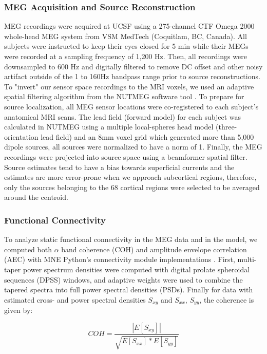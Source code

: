 \subsubsection{MEG Acquisition and Source Reconstruction}
MEG recordings were acquired at UCSF using a 275-channel CTF Omega 2000 whole-head MEG system from VSM MedTech (Coquitlam, BC, Canada). All subjects were instructed to keep their eyes closed for 5 min while their MEGs were recorded at a sampling frequency of 1,200 Hz. Then, all recordings were downsampled to 600 Hz and digitally filtered to remove DC offset and other noisy artifact outside of the 1 to 160Hz bandpass range prior to source reconstructions. To "invert" our sensor space recordings to the MRI voxels, we used an adaptive spatial filtering algorithm from the NUTMEG software tool \cite{dalal_nutmeg:_2004}. To prepare for source localization, all MEG sensor locations were co-registered to each subject's anatomical MRI scans. The lead field (forward model) for each subject was calculated in NUTMEG using a multiple local-spheres head model (three-orientation lead field) and an 8mm voxel grid which generated more than 5,000 dipole sources, all sources were normalized to have a norm of 1. Finally, the MEG recordings were projected into source space using a beamformer spatial filter. Source estimates tend to have a bias towards superficial currents and the estimates are more error-prone when we approach subcortical regions, therefore, only the sources belonging to the 68 cortical regions were selected to be averaged around the centroid.

\subsubsection{Functional Connectivity}
To analyze static functional connectivity in the MEG data and in the model, we computed both $\alpha$ band coherence (COH) and amplitude envelope correlation (AEC) with MNE Python's connectivity module implementations \cite{GramfortEtAl2013a}. First, multi-taper power spectrum densities were computed with digital prolate spheroidal sequences (DPSS) windows, and adaptive weights were used to combine the tapered spectra into full power spectral densities (PSDs). Finally for data with estimated cross- and power spectral densities $S_{xy}$ and $S_{xx}$, $S_{yy}$, the coherence is given by: 

\begin{equation}
    COH = \frac{|E[S_{xy}]|}{\sqrt{E[S_{xx}] * E[S_{yy}]}}
\end{equation}

